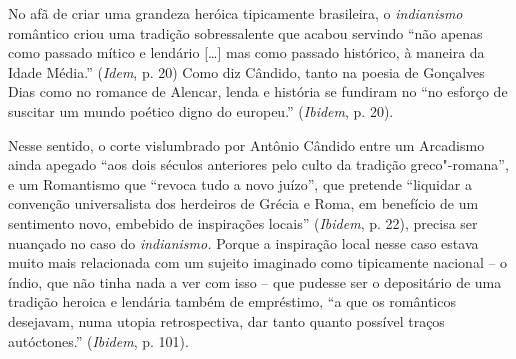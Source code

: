 No afã de criar uma grandeza heróica tipicamente brasileira, o
\emph{indianismo} romântico criou uma tradição sobressalente que acabou
servindo ``não apenas como passado mítico e lendário [\ldots{}] mas como
passado histórico, à maneira da Idade Média.'' (\emph{Idem}, p. 20) Como
diz Cândido, tanto na poesia de Gonçalves Dias como no romance de
Alencar, lenda e história se fundiram no ``no esforço de suscitar um
mundo poético digno do europeu.'' (\emph{Ibidem}, p. 20).

Nesse sentido, o corte vislumbrado por Antônio Cândido entre um
Arcadismo ainda apegado ``aos dois séculos anteriores pelo culto da
tradição greco"-romana'', e um Romantismo que ``revoca tudo a novo
juízo'', que pretende ``liquidar a convenção universalista dos herdeiros
de Grécia e Roma, em benefício de um sentimento novo, embebido de
inspirações locais'' (\emph{Ibidem}, p. 22), precisa ser nuançado no
caso do \emph{indianismo.} Porque a inspiração local nesse caso estava
muito mais relacionada com um sujeito imaginado como tipicamente
nacional -- o índio, que não tinha nada a ver com isso -- que pudesse
ser o depositário de uma tradição heroica e lendária também de
empréstimo, ``a que os românticos desejavam, numa utopia retrospectiva,
dar tanto quanto possível traços autóctones.'' (\emph{Ibidem}, p. 101).

